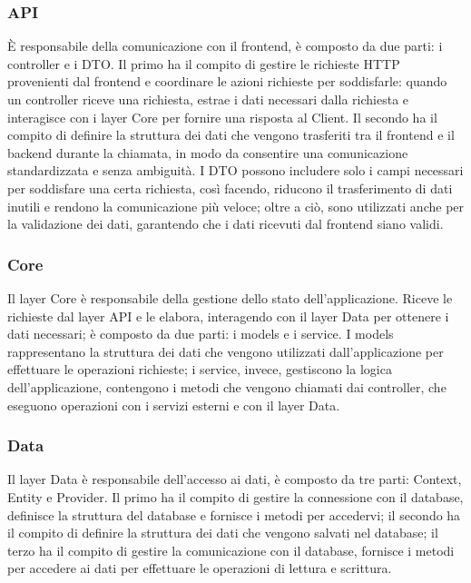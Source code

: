 \subsubsection{API}
È responsabile della comunicazione con il frontend, è composto da due parti: i controller e i DTO. Il primo ha il compito di gestire le richieste HTTP provenienti dal frontend e coordinare le azioni richieste per soddisfarle: quando un controller riceve una richiesta, estrae i dati necessari dalla richiesta e interagisce con i layer Core per fornire una risposta al Client. 
Il secondo ha il compito di definire la struttura dei dati che vengono trasferiti tra il frontend e il backend durante la chiamata, in modo da consentire una comunicazione standardizzata e senza ambiguità. I DTO possono includere solo i campi necessari per soddisfare una certa richiesta, così facendo, riducono il trasferimento di dati inutili e rendono la comunicazione più veloce; oltre a ciò, sono utilizzati anche per la validazione dei dati, garantendo che i dati ricevuti dal frontend siano validi.\\
\subsubsection{Core}
Il layer Core è responsabile della gestione dello stato dell'applicazione. Riceve le richieste dal layer API e le elabora, interagendo con il layer Data per ottenere i dati necessari; è composto da due parti: i models e i service. I models rappresentano la struttura dei dati che vengono utilizzati dall'applicazione per effettuare le operazioni richieste; i service, invece, gestiscono la logica dell'applicazione, contengono i metodi che vengono chiamati dai controller, che eseguono operazioni con i servizi esterni e con il layer Data.\\

\subsubsection{Data}
Il layer Data è responsabile dell'accesso ai dati, è composto da tre parti: Context, Entity e Provider. Il primo ha il compito di gestire la connessione con il database, definisce la struttura del database e fornisce i metodi per accedervi; il secondo ha il compito di definire la struttura dei dati che vengono salvati nel database; il terzo ha il compito di gestire la comunicazione con il database, fornisce i metodi per accedere ai dati per effettuare le operazioni di lettura e scrittura.\\

